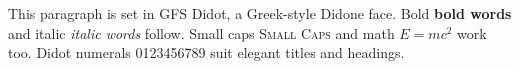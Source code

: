 \documentclass{article}
\begin{document}
This paragraph is set in GFS Didot, a Greek-style Didone face.
Bold \textbf{bold words} and italic \textit{italic words} follow.
Small caps \textsc{Small Caps} and math $E = mc^2$ work too.
Didot numerals 0123456789 suit elegant titles and headings.
\end{document}
